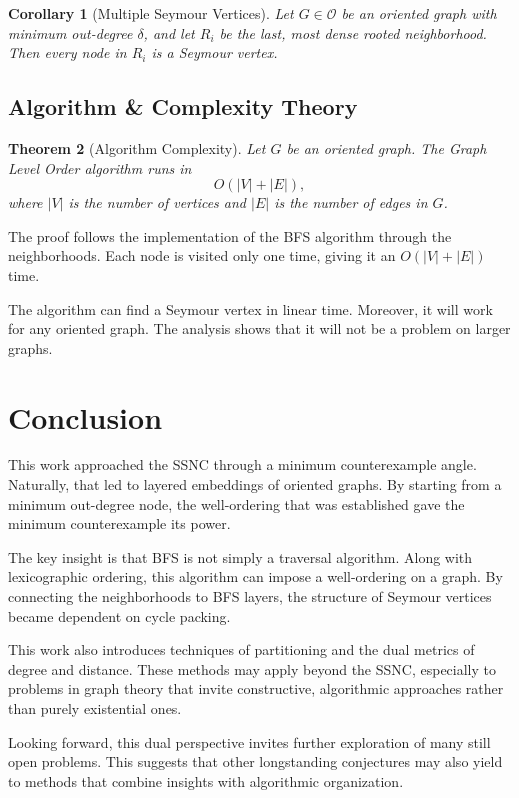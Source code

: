 \documentclass[AMS, Times1COL]{article} %
\newtheorem{theorem}{Theorem}[section]
\newtheorem{corollary}[theorem]{Corollary}
\theoremstyle{definition}
\begin{document}
	\begin{corollary}[Multiple Seymour Vertices] \label{multiDDNodes}
		Let $G \in \mathcal{O}$ be an oriented graph with minimum out-degree $\delta$, and let $R_i$ be the last, most dense rooted neighborhood. Then every node in $R_i$ is a Seymour vertex.
	\end{corollary}
	
	\subsection{Algorithm \& Complexity Theory}
	
	\begin{theorem}[Algorithm Complexity] \label{complx}
		Let $G$ be an oriented graph. The Graph Level Order algorithm runs in $$O(|V| + |E|),$$ where $|V|$ is the number of vertices and $|E|$ is the number of edges in $G$.
	\end{theorem}
	The proof follows the implementation of the BFS algorithm through the neighborhoods. Each node is visited only one time, giving it an $O(|V| + |E|)$ time.
	
	The algorithm can find a Seymour vertex in linear time. Moreover, it will work for any oriented graph. The analysis shows that it will not be a problem on larger graphs.
	
	\section{Conclusion}
	
	This work approached the SSNC through a minimum counterexample angle. Naturally, that led to layered embeddings of oriented graphs. By starting from a minimum out-degree node, the well-ordering that was established gave the minimum counterexample its power.
	
	The key insight is that BFS is not simply a traversal algorithm. Along with lexicographic ordering, this algorithm can impose a well-ordering on a graph. By connecting the neighborhoods to BFS layers, the structure of Seymour vertices became dependent on cycle packing.
	
	This work also introduces techniques of partitioning and the dual metrics of degree and distance. These methods may apply beyond the SSNC, especially to problems in graph theory that invite constructive, algorithmic approaches rather than purely existential ones.
	
	Looking forward, this dual perspective invites further exploration of many still open problems. This suggests that other longstanding conjectures may also yield to methods that combine insights with algorithmic organization.
	
\end{document}
